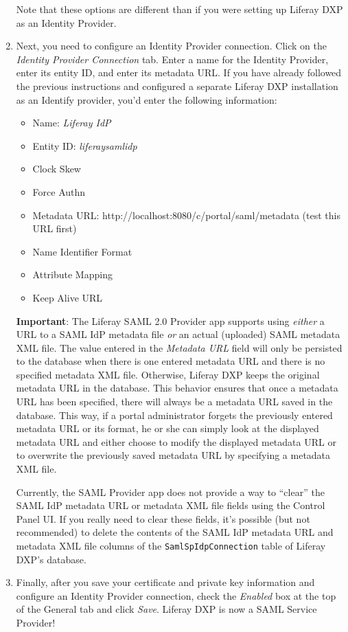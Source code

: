 \begin{enumerate}
  Note that these options are different than if you were setting up
  Liferay DXP as an Identity Provider.
\item
  Next, you need to configure an Identity Provider connection. Click on
  the \emph{Identity Provider Connection} tab. Enter a name for the
  Identity Provider, enter its entity ID, and enter its metadata URL. If
  you have already followed the previous instructions and configured a
  separate Liferay DXP installation as an Identify provider, you'd enter
  the following information:

  \begin{itemize}
  \tightlist
  \item
    Name: \emph{Liferay IdP}
  \item
    Entity ID: \emph{liferaysamlidp}
  \item
    Clock Skew
  \item
    Force Authn
  \item
    Metadata URL: http://localhost:8080/c/portal/saml/metadata (test
    this URL first)
  \item
    Name Identifier Format
  \item
    Attribute Mapping
  \item
    Keep Alive URL
  \end{itemize}

  \textbf{Important}: The Liferay SAML 2.0 Provider app supports using
  \emph{either} a URL to a SAML IdP metadata file \emph{or} an actual
  (uploaded) SAML metadata XML file. The value entered in the
  \emph{Metadata URL} field will only be persisted to the database when
  there is one entered metadata URL and there is no specified metadata
  XML file. Otherwise, Liferay DXP keeps the original metadata URL in
  the database. This behavior ensures that once a metadata URL has been
  specified, there will always be a metadata URL saved in the database.
  This way, if a portal administrator forgets the previously entered
  metadata URL or its format, he or she can simply look at the displayed
  metadata URL and either choose to modify the displayed metadata URL or
  to overwrite the previously saved metadata URL by specifying a
  metadata XML file.

  Currently, the SAML Provider app does not provide a way to ``clear''
  the SAML IdP metadata URL or metadata XML file fields using the
  Control Panel UI. If you really need to clear these fields, it's
  possible (but not recommended) to delete the contents of the SAML IdP
  metadata URL and metadata XML file columns of the
  \texttt{SamlSpIdpConnection} table of Liferay DXP's database.
\item
  Finally, after you save your certificate and private key information
  and configure an Identity Provider connection, check the
  \emph{Enabled} box at the top of the General tab and click
  \emph{Save}. Liferay DXP is now a SAML Service Provider!
\end{enumerate}

